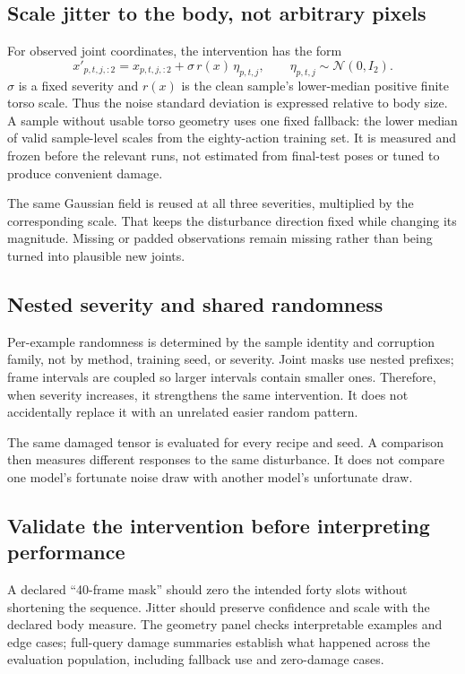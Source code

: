 \subsection{Scale jitter to the body, not arbitrary pixels}
For observed joint coordinates, the intervention has the form
\[
 x'_{p,t,j,:2}=x_{p,t,j,:2}+\sigma\,r(x)\,\eta_{p,t,j},
 \qquad\eta_{p,t,j}\sim\mathcal N(0,I_2).
\]
$\sigma$ is a fixed severity and $r(x)$ is the clean sample's lower-median
positive finite torso scale. Thus the noise standard deviation is expressed
relative to body size. A sample without usable torso geometry uses one fixed
fallback: the lower median of valid sample-level scales from the eighty-action
training set. It is measured and frozen before the relevant runs, not estimated
from final-test poses or tuned to produce convenient damage.

The same Gaussian field is reused at all three severities, multiplied by the
corresponding scale. That keeps the disturbance direction fixed while changing
its magnitude. Missing or padded observations remain missing rather than being
turned into plausible new joints.

\subsection{Nested severity and shared randomness}
Per-example randomness is determined by the sample identity and corruption
family, not by method, training seed, or severity. Joint masks use nested
prefixes; frame intervals are coupled so larger intervals contain smaller ones.
Therefore, when severity increases, it strengthens the same intervention.
It does not accidentally replace it with an unrelated easier random pattern.

The same damaged tensor is evaluated for every recipe and seed. A comparison
then measures different responses to the same disturbance. It does not compare
one model's fortunate noise draw with another model's unfortunate draw.

\subsection{Validate the intervention before interpreting performance}
A declared ``40-frame mask'' should zero the intended forty slots without
shortening the sequence. Jitter should preserve confidence and scale with the
declared body measure. The geometry panel checks interpretable examples and edge
cases; full-query damage summaries establish what happened across the evaluation
population, including fallback use and zero-damage cases.

